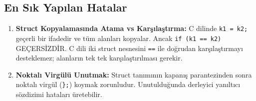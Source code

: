 \subsection*{En Sık Yapılan Hatalar}
\begin{enumerate}
    \item \textbf{Struct Kopyalamasında Atama vs Karşılaştırma:} C dilinde \lstinline|k1 = k2;| geçerli bir ifadedir ve tüm alanları kopyalar. Ancak \lstinline|if (k1 == k2)| GEÇERSİZDİR. C dili iki struct nesnesini \lstinline|==| ile doğrudan karşılaştırmayı desteklemez; alanların tek tek karşılaştırılması gerekir.
    \item \textbf{Noktalı Virgülü Unutmak:} Struct tanımının kapanış parantezinden sonra noktalı virgül (\lstinline|};|) koymak zorunludur. Unutulduğunda derleyici yanıltıcı sözdizimi hataları üretebilir.
\end{enumerate}

